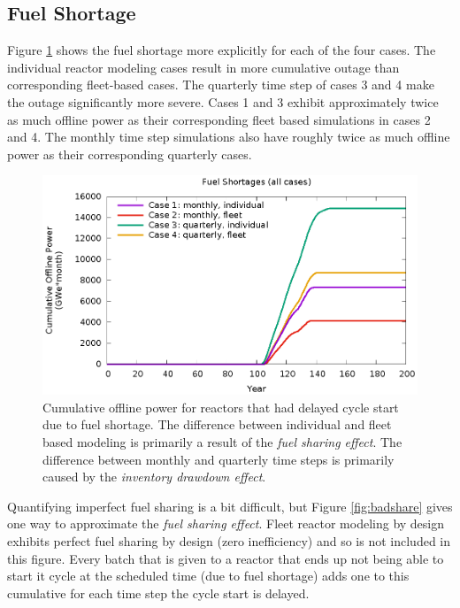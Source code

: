 \documentclass{style}
\begin{document}
\subsection{Fuel Shortage}

Figure \ref{fig:unfueled} shows the fuel shortage more explicitly
for each of the four cases. The individual reactor modeling cases result in
more cumulative outage than corresponding fleet-based cases. The quarterly
time step of cases 3 and 4 make the outage significantly more severe. Cases 1
and 3 exhibit approximately twice as much offline power as their corresponding
fleet based simulations in cases 2 and 4.  The monthly time step simulations
also have roughly twice as much offline power as their corresponding quarterly
cases.

\begin{figure}[!h]
    \centering
    \includegraphics[width=1.0\columnwidth]{exp2/unfueled.eps}
    \caption[Cumulative offline power due to fuel shortage]{
        Cumulative offline power for reactors that had delayed cycle start due
        to fuel shortage. The difference between individual and fleet based
        modeling is primarily a result of the \emph{fuel sharing effect}. The
        difference between monthly and quarterly time steps is primarily
        caused by the \emph{inventory drawdown effect}.
    }
    \label{fig:unfueled}
\end{figure}

Quantifying imperfect fuel sharing is a bit difficult, but Figure
\ref{fig:badshare} gives one way to approximate the \emph{fuel
sharing effect}.  Fleet reactor modeling by design exhibits perfect fuel
sharing by design (zero inefficiency) and so is not included in this figure.
Every batch that is given to a reactor that ends up not being able to start it
cycle at the scheduled time (due to fuel shortage) adds one to this cumulative
for each time step the cycle start is delayed.
\end{document}
